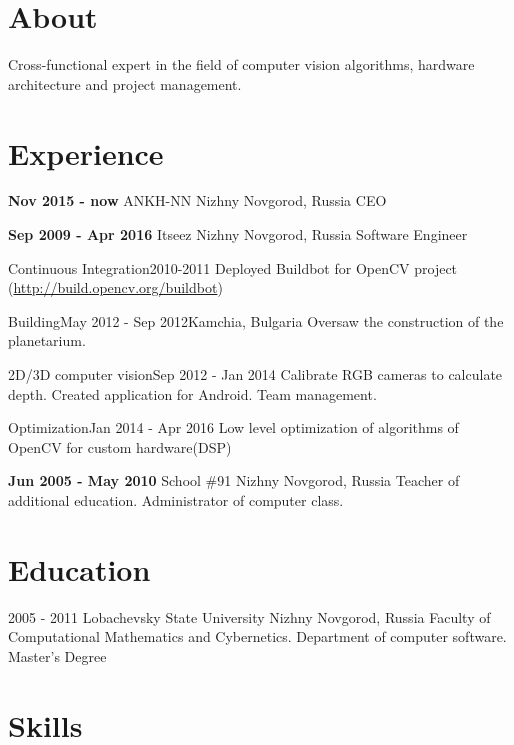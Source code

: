 \documentclass[11pt,a4paper]{moderncv}
\begin{document}
\maketitle


\section{About}
Cross-functional expert in the field of computer vision algorithms, hardware architecture and project management.

\section{Experience}
\cventry
  {\textbf{Nov 2015 - now}}
  {ANKH-NN}
  {Nizhny Novgorod, Russia}
  {}{}
  {CEO}
  
\cventry
	{\textbf{Sep 2009 - Apr 2016}}
  {Itseez}
  {Nizhny Novgorod, Russia}
  {}{}
  {Software Engineer}
  
  \cventry
  {}{Continuous Integration}{2010-2011}{}{}
  {Deployed Buildbot for OpenCV project (\url{http://build.opencv.org/buildbot})}

	\cventry
  {}{Building}{May 2012 - Sep 2012}{Kamchia, Bulgaria}{}
  {Oversaw the construction of the planetarium.}


  \cventry
  {}{2D/3D computer vision}{Sep 2012 - Jan 2014}{} {}
  {Calibrate RGB cameras to calculate depth. Created application for Android. Team management.}

	\cventry
  {}{Optimization}{Jan 2014 - Apr 2016}{}{}   
  {Low level optimization of algorithms of OpenCV for custom hardware(DSP)}


\cventry
  {\textbf{Jun 2005 - May 2010}}
  {School \#91}
  {Nizhny Novgorod, Russia}
  {}{}
  {Teacher of additional education. Administrator of computer class.}
  
\section{Education}
  \cventry
    {2005 - 2011}
    {Lobachevsky State University}
    {Nizhny Novgorod, Russia}
    {}{}
    {Faculty of Computational Mathematics and Cybernetics. Department of computer software.\newline{}
    Master's Degree}


\section{Skills}
\end{document}
